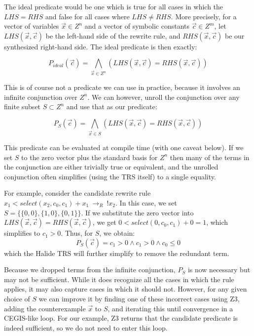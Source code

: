 \documentclass[acmsmall,review]{acmart}\settopmatter{printfolios=true,printccs=false,printacmref=false}
\newcommand{\rewrites}[0]{\:\rightarrow_{R}\:}
\begin{document}
The ideal predicate would be one which is true for all cases in which
the $LHS = RHS$ and false for all cases where $LHS \neq RHS$. More
precisely, for a vector of variables $\vec{x} \in Z^n$ and a vector of
symbolic constants $\vec{c} \in Z^m$, let $LHS(\vec{x}, \vec{c})$ be the left-hand side
of the rewrite rule, and $RHS(\vec{x}, \vec{c})$ be our synthesized
right-hand side. The ideal predicate is then exactly:

\[
P_{ideal}(\vec{c}) = \bigwedge\limits_{\vec{x} \in Z^n} ( LHS(\vec{x}, \vec{c}) = RHS(\vec{x}, \vec{c}) )
\]

This is of course not a predicate we can use in practice, because it
involves an infinite conjunction over $Z^n$. We can however, unroll
the conjunction over any finite subset $S \subset Z^n$ and use that as
our predicate:

\[
P_S(\vec{c}) = \bigwedge\limits_{\vec{x} \in S} ( LHS(\vec{x}, \vec{c}) = RHS(\vec{x}, \vec{c}) )
\]

This predicate can be evaluated at compile time (with one caveat
below). If we set $S$ to the zero vector plus the standard basis for
$Z^n$ then many of the terms in the conjunction are either trivially
true or equivalent, and the unrolled conjunction often simplifies
(using the TRS itself) to a single equality.

For example, consider the candidate rewrite rule
$x_1 < select(x_2, c_0, c_1) + x_1 \rewrites !x_2$.  In this case,
we set $S = \{\{0, 0\}, \{1, 0\}, \{0, 1\}\}$.  If we substitute the zero
vector into $LHS(\vec{x}, \vec{c}) = RHS(\vec{x}, \vec{c})$, we get
$0 < select(0, c_0, c_1) + 0 = 1$, which simplifies to $c_1 > 0$.  Thus, for $S$,
we obtain:
$$P_S(\vec{c}) = c_1 > 0 \wedge c_1 > 0 \wedge c_0 \le 0$$
which the Halide TRS will further simplify to remove the redundant term.

Because we dropped terms from the infinite conjunction, $P_S$
is now necessary but may not be sufficient. While it does recognize all the
cases in which the rule applies, it may also capture cases in which it
should not. However, for any given choice of $S$ we can improve it by
finding one of these incorrect cases using Z3, adding the
counterexample $\vec{x}$ to $S$, and iterating this until convergence in a
CEGIS-like loop.  For our example, Z3 returns that the candidate
predicate is indeed sufficient, so we do not need to enter this loop.
\end{document}
